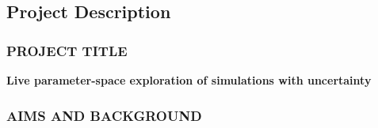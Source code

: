 \documentclass[a4paper,fontsize=12pt]{scrartcl}
\author{}
\date{\today}
\begin{document}
\renewcommand{\thesection}{\Alph{section}}

\setcounter{section}{3} %
\subsection{Project Description}
\label{sec:project-description}

\subsubsection*{PROJECT TITLE}

\textbf{Live parameter-space exploration of simulations with uncertainty}





\subsubsection*{AIMS AND BACKGROUND}
\end{document}
